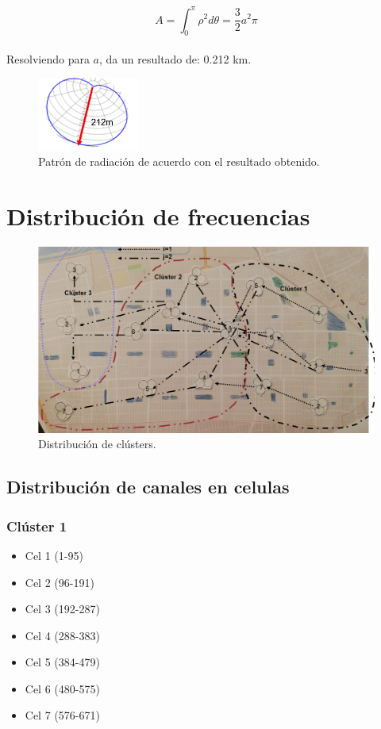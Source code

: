 \documentclass[11pt,letterpaper]{article}
\begin{document}
\begin{equation}
    A=\int_{0}^{\pi} \rho^2 d\theta = \frac{3}{2} a^2 \pi
\end{equation}
\\
Resolviendo para $a$, da un resultado de: 0.212 km.
\begin{figure}[ht]
    \centering
    \includegraphics[width=0.3\textwidth]{imagenes/t10.png}
    \caption{Patrón de radiación de acuerdo con el resultado obtenido.}
\end{figure}

\newpage
\section{Distribución de frecuencias}
\begin{figure}[ht]
    \centering
    \includegraphics[width=.9\textwidth, angle=90]{imagenes/t11.png}
    \caption{Distribución de clústers.}
\end{figure}

\newpage
\subsection{Distribución de canales en celulas}
\subsubsection{Clúster 1}
\begin{itemize}
    \item Cel 1 (1-95)
    \item Cel 2 (96-191)
    \item Cel 3 (192-287)
    \item Cel 4 (288-383)
    \item Cel 5 (384-479)
    \item Cel 6 (480-575)
    \item Cel 7 (576-671)
\end{itemize}
\end{document}
